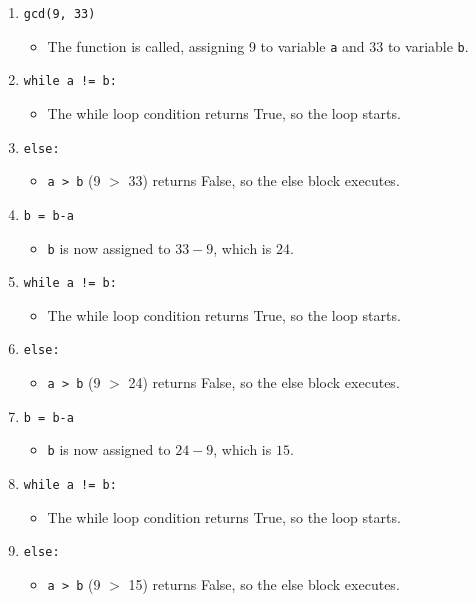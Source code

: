 \documentclass{article}
\theoremstyle{theorem}
\theoremstyle{definition}
\theoremstyle{remark}
\begin{document}
\begin{enumerate}[noitemsep]
  \item \texttt{gcd(9, 33)}
  \begin{itemize}
      \item The function is called, assigning 9 to variable \texttt{a} and 33 to variable \texttt{b}.
  \end{itemize} 
  \item \texttt{while a != b:}
  \begin{itemize}
      \item The while loop condition returns True, so the loop starts.
  \end{itemize}
  \item \texttt{else:}
  \begin{itemize}
      \item \texttt{a > b} (9 $>$ 33) returns False, so the else block executes.
  \end{itemize}
  \item \texttt{b = b-a}
  \begin{itemize}
      \item \texttt{b} is now assigned to $33 - 9$, which is $24$.
  \end{itemize}
  \item \texttt{while a != b:}
  \begin{itemize}
      \item The while loop condition returns True, so the loop starts.
  \end{itemize}
  \item \texttt{else:}
  \begin{itemize}
      \item \texttt{a > b} (9 $>$ 24) returns False, so the else block executes.
  \end{itemize}
  \item \texttt{b = b-a}
  \begin{itemize}
      \item \texttt{b} is now assigned to $24 - 9$, which is $15$.
  \end{itemize}
  \item \texttt{while a != b:}
  \begin{itemize}
      \item The while loop condition returns True, so the loop starts.
  \end{itemize}
  \item \texttt{else:}
  \begin{itemize}
      \item \texttt{a > b} (9 $>$ 15) returns False, so the else block executes.

\end{itemize}
\end{enumerate}
\end{document}
